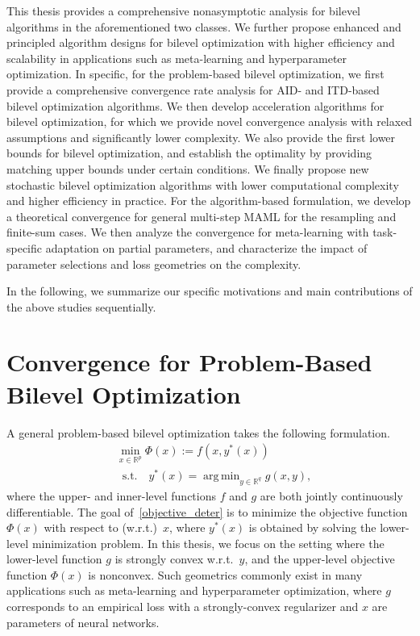 \documentclass{osudissert96}
\DeclareMathOperator*{\argmin}{arg\,min}
\begin{document}
This thesis provides a comprehensive nonasymptotic analysis for bilevel algorithms in the aforementioned two classes. We further propose enhanced and principled algorithm designs for bilevel optimization with higher efficiency and scalability in applications such as meta-learning and hyperparameter optimization. In specific, for the problem-based bilevel optimization, we first provide a comprehensive convergence rate analysis for AID- and ITD-based bilevel optimization algorithms. We then develop acceleration algorithms for bilevel optimization, for which we provide novel convergence analysis with relaxed assumptions and significantly lower complexity. We also provide the first lower bounds for bilevel optimization, and establish the optimality by providing matching upper bounds under certain conditions. We finally propose new stochastic bilevel optimization algorithms with lower computational complexity and higher efficiency in practice.  For the algorithm-based formulation, we develop a theoretical convergence for general multi-step MAML for the resampling and finite-sum cases. We then analyze the convergence for meta-learning with task-specific adaptation on partial parameters, and characterize the impact of parameter selections and loss geometries on the complexity.  
   
In the following, we summarize our specific motivations and main contributions of the above studies sequentially. 
\section{Convergence for Problem-Based Bilevel Optimization}
 A general problem-based bilevel optimization takes the following formulation. 
\begin{align}\label{objective_deter}
&\min_{x\in\mathbb{R}^{p}} \Phi(x):=f(x, y^*(x)) \nonumber
\\&\;\;\mbox{s.t.} \quad y^*(x)= \argmin_{y\in\mathbb{R}^{q}} g(x,y),
\end{align}
where the upper- and inner-level functions $f$ and $g$ are both jointly continuously differentiable. The goal of~\cref{objective_deter} is to minimize the objective function $\Phi(x)$ with respect to (w.r.t.)~$x$, where $y^*(x)$ is obtained by solving the lower-level minimization problem. In this thesis, we focus on the setting where the lower-level function $g$ is strongly convex w.r.t.~$y$, and the upper-level objective function $\Phi(x)$ is nonconvex. Such geometrics commonly exist in many applications such as meta-learning and hyperparameter optimization, where $g$ corresponds to an empirical loss  with a strongly-convex regularizer and $x$ are parameters of neural networks.
 
\end{document}
